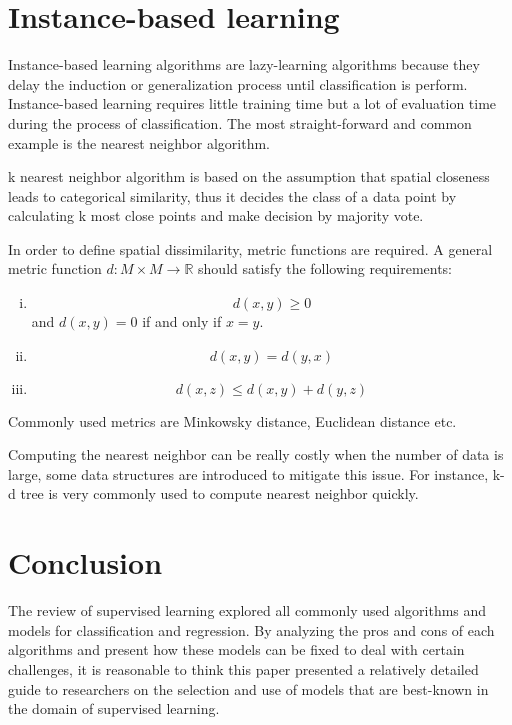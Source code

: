 \documentclass[10pt,twocolumn,letterpaper]{article}
\begin{document}
\section{Instance-based learning}
	Instance-based learning algorithms are lazy-learning algorithms\cite{mitchell_2017} because they delay the induction or generalization process until classification is perform\cite{kotsiantis2007supervised}. Instance-based learning requires little training time but a lot of evaluation time during the process of classification\cite{kotsiantis2007supervised}. The most straight-forward and common example is the nearest neighbor algorithm.
	
	k nearest neighbor algorithm is based on the assumption that spatial closeness leads to categorical similarity, thus it decides the class of a data point by calculating k most close points and make decision by majority vote.
	
	In order to define spatial dissimilarity, metric functions are required. A general metric function $d : M \times M \rightarrow \mathbb{R}$ should satisfy the following requirements:
	
	\begin{enumerate}[(i).]
		\item \[d(x, y) \geq 0\]
		and $d(x,y) = 0$ if and only if $x = y$.
		\item \[d(x,y) = d(y,x)\]
		\item \[d(x,z) \leq d(x,y) + d(y,z)\]
	\end{enumerate}
	
	Commonly used metrics are Minkowsky distance, Euclidean distance etc.\cite{kotsiantis2007supervised}
	
	Computing the nearest neighbor can be really costly when the number of data is large, some data structures are introduced to mitigate this issue. For instance, k-d tree\cite{bentley_1975} is very commonly used to compute nearest neighbor quickly.
\section{Conclusion}
	The review of supervised learning explored all commonly used algorithms and models for classification and regression. By analyzing the pros and cons of each algorithms and present how these models can be fixed to deal with certain challenges, it is reasonable to think this paper presented a relatively detailed guide to researchers on the selection and use of models that are best-known in the domain of supervised learning.

{\small


}
\end{document}
